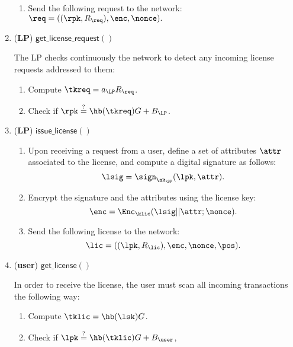 \begin{enumerate}
\begin{enumerate}
		\item Send the following request to the network: $\req = ((\rpk, R_{\req}), \enc, \nonce).$
		
	\end{enumerate}


\item (\textbf{LP}) $\mathsf{get\_license\_request()}$

	The LP checks continuously the network to detect any incoming license requests addressed to them:
	
	\begin{enumerate}
		\item Compute $\tkreq = a_{\LP}R_{\req}$.
		\item Check if $\rpk \stackrel{?}{=} \hb(\tkreq) G + B_{\LP}$.
	\end{enumerate}
	

\item (\textbf{LP}) $\mathsf{issue\_license()}$
	
	\begin{enumerate}
		\item Upon receiving a request from a user, define a set of attributes $\attr$ associated to the license, and compute a digital signature as follows:
				$$\lsig = \sign_{\sk_{\SP}}(\lpk, \attr).$$
		\item Encrypt the signature and the attributes using the license key:
			  	$$\enc = \Enc_{\klic} (\lsig || \attr; \nonce).$$
		\item Send the following license to the network:
				$$\lic = ((\lpk, R_{\lic}), \enc, \nonce, \pos).$$
	\end{enumerate}
	
\item (\textbf{user}) $\mathsf{get\_license()}$

	In order to receive the license, the user must scan all incoming transactions the following way:
	
	\begin{enumerate}
		\item Compute $\tklic = \hb(\lsk)G$.
		\item Check if $\lpk \stackrel{?}{=} \hb(\tklic) G + B_{\user}$, 
	\end{enumerate}	
	
	

\end{enumerate}
